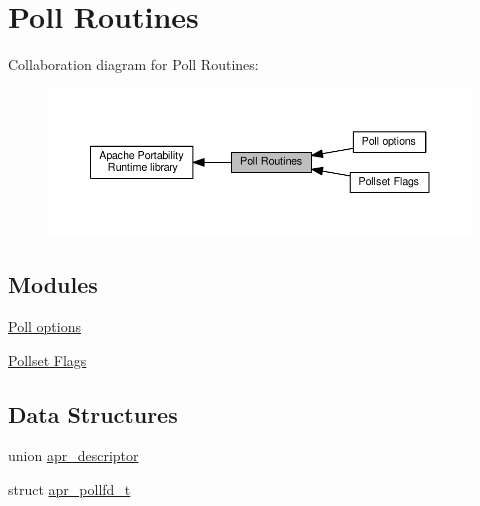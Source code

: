 \hypertarget{group__apr__poll}{}\section{Poll Routines}
\label{group__apr__poll}
Collaboration diagram for Poll Routines\+:
\nopagebreak
\begin{figure}[H]
\begin{center}
\leavevmode
\includegraphics[width=350pt]{group__apr__poll}
\end{center}
\end{figure}
\subsection*{Modules}
\begin{DoxyCompactItemize}
\item 
\hyperlink{group__pollopts}{Poll options}
\item 
\hyperlink{group__pollflags}{Pollset Flags}
\end{DoxyCompactItemize}
\subsection*{Data Structures}
\begin{DoxyCompactItemize}
\item 
union \hyperlink{unionapr__descriptor}{apr\+\_\+descriptor}
\item 
struct \hyperlink{structapr__pollfd__t}{apr\+\_\+pollfd\+\_\+t}
\end{DoxyCompactItemize}
